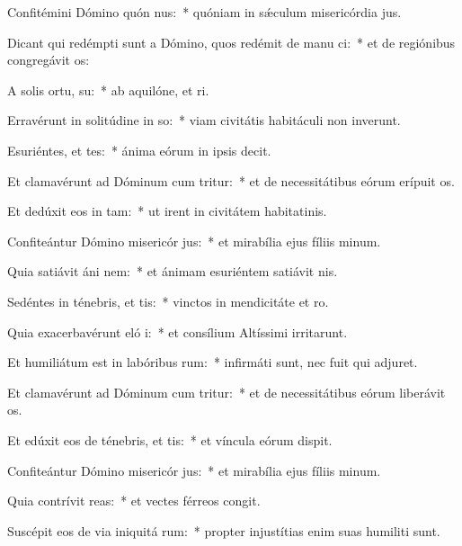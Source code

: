 \item Confitémini Dómino quón nus:~* quóniam in sǽculum misericórdia jus.
\item Dicant qui redémpti sunt a Dómino, quos redémit de manu ci:~* et de regiónibus congregávit os:
\item A solis ortu,  su:~* ab aquilóne, et ri.
\item Erravérunt in solitúdine in so:~* viam civitátis habitáculi non inverunt.
\item Esuriéntes, et tes:~* ánima eórum in ipsis decit.
\item Et clamavérunt ad Dóminum cum tritur:~* et de necessitátibus eórum erípuit os.
\item Et dedúxit eos in  tam:~* ut irent in civitátem habitatinis.
\item Confiteántur Dómino misericór jus:~* et mirabília ejus fíliis minum.
\item Quia satiávit áni nem:~* et ánimam esuriéntem satiávit nis.
\item Sedéntes in ténebris, et  tis:~* vinctos in mendicitáte et ro.
\item Quia exacerbavérunt eló i:~* et consílium Altíssimi irritarunt.
\item Et humiliátum est in labóribus  rum:~* infirmáti sunt, nec fuit qui adjuret.
\item Et clamavérunt ad Dóminum cum tritur:~* et de necessitátibus eórum liberávit os.
\item Et edúxit eos de ténebris, et  tis:~* et víncula eórum dispit.
\item Confiteántur Dómino misericór jus:~* et mirabília ejus fíliis minum.
\item Quia contrívit  reas:~* et vectes férreos congit.
\item Suscépit eos de via iniquitá rum:~* propter injustítias enim suas humiliti sunt.
